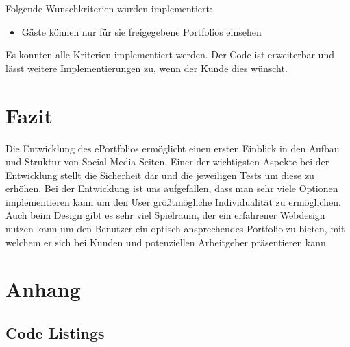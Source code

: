 \documentclass[10.5pt]{scrarticle}
\begin{document}
Folgende Wunschkriterien wurden implementiert:

\begin{itemize}
	\item Gäste können nur für sie freigegebene Portfolios einsehen
\end{itemize}

Es konnten alle Kriterien implementiert werden. Der Code ist erweiterbar und lässt weitere Implementierungen zu, wenn der Kunde dies wünscht.

\section{Fazit}

Die Entwicklung des ePortfolios ermöglicht einen ersten Einblick in den Aufbau und Struktur von Social Media Seiten. Einer der wichtigsten Aspekte bei der Entwicklung stellt die Sicherheit dar und die jeweiligen Tests um diese zu erhöhen. Bei der Entwicklung ist uns aufgefallen, dass man sehr viele Optionen implementieren kann um den User größtmögliche Individualität zu ermöglichen. Auch beim Design gibt es sehr viel Spielraum, der ein erfahrener Webdesign nutzen kann um den Benutzer ein optisch ansprechendes Portfolio zu bieten, mit welchem er sich bei Kunden und potenziellen Arbeitgeber präsentieren kann.

\newpage
\section{Anhang}
\subsection{Code Listings}

\lstset{firstnumber=1, basicstyle=\footnotesize}
\end{document}
